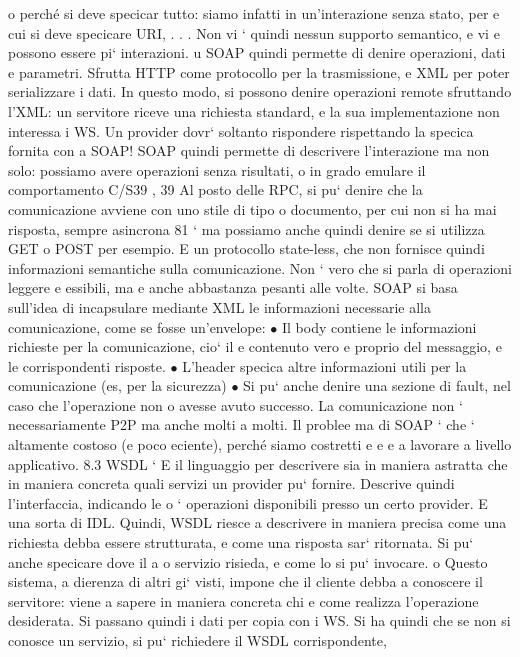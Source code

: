\documentclass[a4paper,12pt]{article}
\begin{document}
o
perché si deve specicar tutto: siamo infatti in un'interazione senza stato, per
e
cui si deve specicare URI, . . . Non vi ` quindi nessun supporto semantico, e vi
e
possono essere pi` interazioni.
u
SOAP quindi permette di denire operazioni, dati e parametri. Sfrutta
HTTP come protocollo per la trasmissione, e XML per poter serializzare i dati.
In questo modo, si possono denire operazioni remote sfruttando l'XML: un
servitore riceve una richiesta standard, e la sua implementazione non interessa i
WS. Un provider dovr` soltanto rispondere rispettando la specica fornita con
a
SOAP!
SOAP quindi permette di descrivere l'interazione ma non solo: possiamo
avere operazioni senza risultati, o in grado emulare il comportamento C/S39 ,
39 Al posto delle RPC, si pu` denire che la comunicazione avviene con uno stile di tipo
o
documento, per cui non si ha mai risposta, sempre asincrona
81
\newpage
`
ma possiamo anche quindi denire se si utilizza GET o POST per esempio. E
un protocollo state-less, che non fornisce quindi informazioni semantiche sulla
comunicazione. Non ` vero che si parla di operazioni leggere e essibili, ma
e
anche abbastanza pesanti alle volte.
SOAP si basa sull'idea di incapsulare mediante XML le informazioni necessarie alla comunicazione, come se fosse
un'envelope:
$\bullet$ Il body contiene le informazioni richieste per la comunicazione, cio` il
e
contenuto vero e proprio del messaggio, e le corrispondenti risposte.
$\bullet$ L'header specica altre informazioni utili per la comunicazione (es, per la
sicurezza)
$\bullet$ Si pu` anche denire una sezione di fault, nel caso che l'operazione non
o
avesse avuto successo.
La comunicazione non ` necessariamente P2P ma anche molti a molti. Il problee
ma di SOAP ` che ` altamente costoso (e poco eciente), perché siamo costretti
e
e
e
a lavorare a livello applicativo.
8.3
WSDL
`
E il linguaggio per descrivere sia in maniera astratta che in maniera concreta
quali servizi un provider pu` fornire. Descrive quindi l'interfaccia, indicando le
o
`
operazioni disponibili presso un certo provider. E una sorta di IDL. Quindi,
WSDL riesce a descrivere in maniera precisa come una richiesta debba essere
strutturata, e come una risposta sar` ritornata. Si pu` anche specicare dove il
a
o
servizio risieda, e come lo si pu` invocare.
o
Questo sistema, a dierenza di altri gi` visti, impone che il cliente debba
a
conoscere il servitore: viene a sapere in maniera concreta chi e come realizza
l'operazione desiderata. Si passano quindi i dati per copia con i WS. Si ha quindi che se non si conosce un servizio, si
pu` richiedere il WSDL corrispondente,
\end{document}
